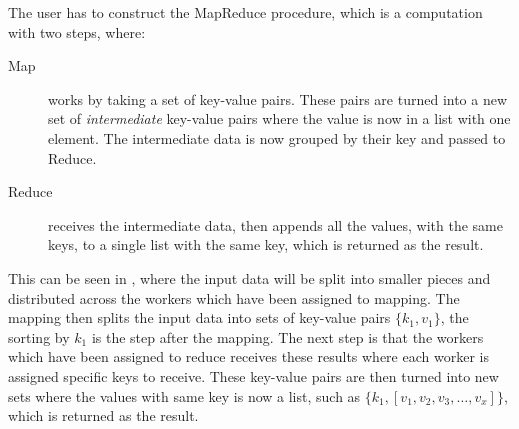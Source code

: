 The user has to construct the MapReduce procedure, which is a computation with two steps, where: 
\begin{description}
\item[Map] works by taking a set of key-value pairs. These pairs are turned into a new set of \emph{intermediate} key-value pairs where the value is now in a list with one element. The intermediate data is now grouped by their key and passed to Reduce.
\item[Reduce] receives the intermediate data, then appends all the values, with the same keys, to a single list with the same key, which is returned as the result.
\end{description}
This can be seen in , where the input data will be split into smaller pieces and distributed across the workers which have been assigned to mapping. The mapping then splits the input data into sets of key-value pairs $\{k_1,v_1\}$, the sorting by $k_1$ is the step after the mapping. The next step is that the workers which have been assigned to reduce receives these results where each worker is assigned specific keys to receive. These key-value pairs are then turned into new sets where the values with same key is now a list, such as $\{k_1, [v_1,v_2,v_3,\dots,v_x]\}$, which is returned as the result.



